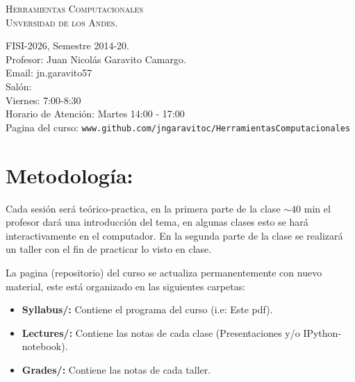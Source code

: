 \documentclass[letterpaper]{article}
\begin{document}
\begin{center}
\textsc{\LARGE Herramientas Computacionales}\\
\textsc{\large Unversidad de los Andes.}\\
\end{center}
\large{FISI-2026, Semestre 2014-20.}\\
\large{Profesor: Juan Nicol\'as Garavito Camargo.}\\
\large{Email: jn.garavito57}\\
\large{Sal\'on:}\\
\large{Viernes: 7:00-8:30}\\
\large{Horario de Atenci\'on: Martes 14:00 - 17:00}\\
\large{Pagina del curso: \verb"www.github.com/jngaravitoc/HerramientasComputacionales"}




\section*{Metodolog\'ia:}

Cada sesi\'on ser\'a te\'orico-practica, en la primera parte de la clase $\sim 40$ min el profesor 
dar\'a una introducci\'on del tema, en algunas clases esto se har\'a interactivamente en el computador. 
En la segunda parte de la clase se realizar\'a un taller con el fin de practicar
lo visto en clase.

La pagina (repositorio) del curso se actualiza permanentemente con nuevo material, este est\'a organizado en las siguientes carpetas:\\

\begin{itemize}
\item \textbf{Syllabus/:} Contiene el programa del curso (i.e: Este pdf).
\item \textbf{Lectures/:} Contiene las notas de cada clase (Presentaciones y/o IPython-notebook).
\item \textbf{Grades/:} Contiene las notas de cada taller.
\end{itemize}
 
\end{document}
